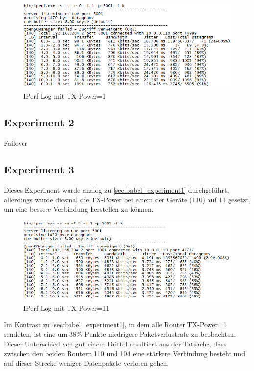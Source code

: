 \documentclass[10pt]{scrartcl}
\begin{document}
	\begin{figure}
        \centering
                \includegraphics[width=\textwidth]{img/Babel_TX1_Protokoll}
        \caption{IPerf Log mit TX-Power=1}
        \label{img:babel_iperf_tx1}
	\end{figure}
	

	
	\subsection{Experiment 2}
	Failover	
	
	\subsection{Experiment 3}\label{sec:babel_experiment3}
	Dieses Experiment wurde analog zu \ref{sec:babel_experiment1} durchgeführt, allerdings wurde diesmal die TX-Power bei einem der Geräte (110) auf 11 gesetzt, um eine bessere Verbindung herstellen zu können.	

	\begin{figure}
        \centering
                \includegraphics[width=\textwidth]{img/Babel_TX11_Protokoll}
        \caption{IPerf Log mit TX-Power=11}
        \label{img:babel_iperf_tx11}
	\end{figure}
	
Im Kontrast zu \ref{sec:babel_experiment1}, in dem alle Router TX-Power=1 sendeten, ist eine um 38\% Punkte niedrigere Paketverlustrate zu beobachten. Dieser Unterschied von gut einem Drittel resultiert aus der Tatsache, dass zwischen den beiden Routern 110 und 104 eine stärkere Verbindung besteht und auf dieser Strecke weniger Datenpakete verloren gehen.
\end{document}
